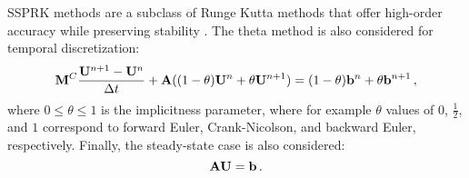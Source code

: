 SSPRK methods are a subclass of Runge Kutta methods that offer high-order
accuracy while preserving stability \cite{gottlieb}\cite{macdonald}.
The theta method is also considered for temporal discretization:
\begin{equation}
  \mathbf{M}^C\frac{\mathbf{U}^{n+1}-\mathbf{U}^n}{\Delta t} + \mathbf{A}((1-\theta)\mathbf{U}^n + \theta\mathbf{U}^{n+1})
  = (1-\theta)\mathbf{b}^n + \theta\mathbf{b}^{n+1} \,,
\end{equation}
where $0\leq\theta\leq 1$ is the implicitness parameter, where for example
$\theta$ values of $0$, $\frac{1}{2}$, and $1$ correspond to forward Euler,
Crank-Nicolson, and backward Euler, respectively. Finally, the steady-state
case is also considered:
\begin{equation}
  \mathbf{A}\mathbf{U} = \mathbf{b} \,.
\end{equation}
